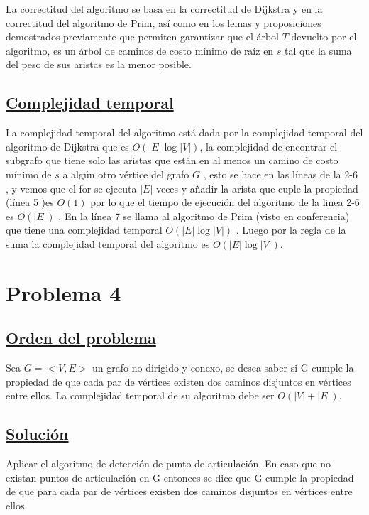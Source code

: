 \documentclass{article}
\begin{document}
    \noindent La correctitud del algoritmo se basa en la correctitud  de Dijkstra  
    y en la correctitud del algoritmo de Prim, as\'i como en los lemas y proposiciones demostrados previamente 
    que permiten garantizar  que el \'arbol $T$ devuelto por el algoritmo, es un \'arbol de caminos de costo
    m\'inimo de ra\'iz en $s$ tal que la suma del peso de sus aristas es la menor posible.
    

    \subsection{\underline{Complejidad temporal}}

    \noindent La complejidad temporal del algoritmo est\'a dada por  la complejidad temporal del algoritmo de Dijkstra 
    que es $O(|E|\log |V|)$, la complejidad de encontrar el subgrafo que tiene solo las aristas que est\'an en al menos 
    un camino de costo m\'inimo de $s$ a alg\'un otro v\'ertice del grafo $G$ , esto se hace en las l\'ineas de la 2-6 , y vemos que el for se 
    ejecuta $|E|$ veces  y a\~nadir la arista que cuple la propiedad (l\'inea 5 )es $O(1)$ por lo que el tiempo de ejecuci\'on del algoritmo 
    de la linea 2-6 es $O(|E|)$ . En la l\'inea 7 se llama al algoritmo de Prim (visto en conferencia) que tiene una complejidad temporal
    $O(|E|\log |V|)$ . Luego por la regla de la suma la complejidad temporal del algoritmo es  $O(|E|\log |V|)$.

    \newpage


    \section{Problema 4} 

    \subsection{\underline{Orden del problema}} 
    Sea $G = <V, E>$ un grafo no dirigido y conexo, se desea saber si G cumple la propiedad de que cada par de
    v\'ertices existen dos caminos disjuntos en v\'ertices entre ellos. La complejidad temporal de su algoritmo debe
    ser $O(|V| + |E|)$.
    \newline
    \newline
    \subsection{\underline{Soluci\'on}} 
    Aplicar el algoritmo de detecci\'on de punto de articulaci\'on  .En caso que no  existan puntos de articulaci\'on
    en G entonces se dice que G cumple la propiedad de que para cada par de v\'ertices  existen dos caminos disjuntos
    en v\'ertices entre ellos.\\ 
\end{document}
